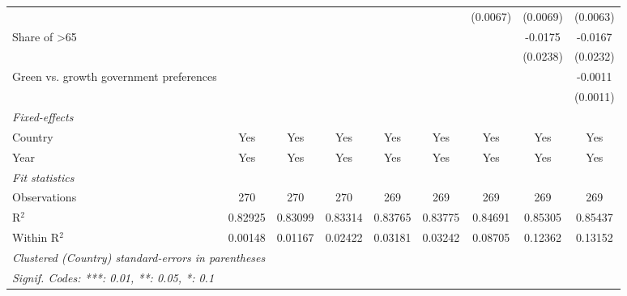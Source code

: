 \begin{table}[htbp]
\begin{tabular}{lcccccccc}
                                                               &          &          &          &          &          & (0.0067) & (0.0069) & (0.0063)\\   
      Share of >65                                             &          &          &          &          &          &          & -0.0175  & -0.0167\\   
                                                               &          &          &          &          &          &          & (0.0238) & (0.0232)\\   
      Green vs. growth government preferences                  &          &          &          &          &          &          &          & -0.0011\\   
                                                               &          &          &          &          &          &          &          & (0.0011)\\   
      \midrule
      \emph{Fixed-effects}\\
      Country                                                  & Yes      & Yes      & Yes      & Yes      & Yes      & Yes      & Yes      & Yes\\  
      Year                                                     & Yes      & Yes      & Yes      & Yes      & Yes      & Yes      & Yes      & Yes\\  
      \midrule
      \emph{Fit statistics}\\
      Observations                                             & 270      & 270      & 270      & 269      & 269      & 269      & 269      & 269\\  
      R$^2$                                                    & 0.82925  & 0.83099  & 0.83314  & 0.83765  & 0.83775  & 0.84691  & 0.85305  & 0.85437\\  
      Within R$^2$                                             & 0.00148  & 0.01167  & 0.02422  & 0.03181  & 0.03242  & 0.08705  & 0.12362  & 0.13152\\  
      \midrule \midrule
      \multicolumn{9}{l}{\emph{Clustered (Country) standard-errors in parentheses}}\\
      \multicolumn{9}{l}{\emph{Signif. Codes: ***: 0.01, **: 0.05, *: 0.1}}\\
   \end{tabular}
\end{table}


